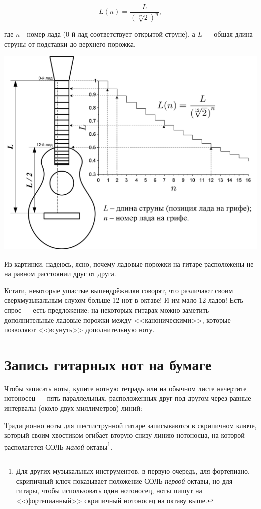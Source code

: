\begin{equation}
    \label{fig:guitar:construction:length}
    L(n)=\frac{L}{(\sqrt[12]{2})^n},
\end{equation}

где $n$ - номер лада ($0$-й лад соответствует открытой струне), а $L$ --- общая длина струны от подставки до верхнего порожка.


\includegraphics{fig/string-length.png}


Из картинки, надеюсь, ясно, почему ладовые порожки на гитаре расположены не на равном расстоянии друг от друга.

Кстати, некоторые ушастые выпендрёжники говорят, что различают своим сверхмузыкальным слухом больше 12 нот в октаве! И им мало 12 ладов! Есть спрос --- есть предложение: на некоторых гитарах можно заметить дополнительные ладовые порожки между <<каноническими>>, которые позволяют <<всунуть>> дополнительную ноту.


\section{Запись гитарных нот на бумаге}

Чтобы записать ноты, купите нотную тетрадь или на обычном листе начертите нотоносец --- пять параллельных, расположенных друг под другом через равные интервалы (около двух миллиметров) линий:
 

Традиционно ноты для шестиструнной гитаре записываются в скрипичном ключе, который своим хвостиком огибает вторую снизу линию нотоносца, на которой располагется СОЛЬ \emph{малой} октавы\footnote{Для других музыкальных инструментов, в первую очередь, для фортепиано, скрипичный ключ показывает положение СОЛЬ \emph{первой} октавы, но для гитары, чтобы использовать один нотоносец, ноты пишут на <<фортепианный>> скрипичный нотоносец на октаву выше.}.


